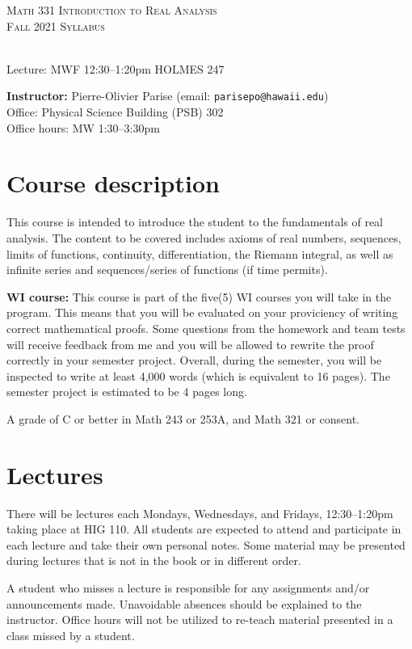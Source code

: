 \documentclass[12pt]{amsart}
\newcommand{\spacer}{\vspace{.2cm}}
\begin{document}
\noindent\hrulefill
\begin{center}
\large{\textsc{Math 331 Introduction to Real Analysis} } \\
\textsc{Fall 2021 Syllabus}
\end{center}
\hrulefill \\
Lecture: MWF 12:30--1:20pm \hfill HOLMES 247

\spacer

\noindent\textbf{Instructor:} Pierre-Olivier Parise (email: \texttt{parisepo@hawaii.edu})\\
Office: Physical Science Building (PSB) 302\\
Office hours: MW 1:30--3:30pm

\noindent\hrulefill

\section*{Course description}
This course is intended to introduce the student to the fundamentals of real analysis. The content to be covered includes axioms of real numbers, sequences, limits of functions, continuity, differentiation, the Riemann integral, as well as infinite series and sequences/series of functions (if time permits).

{\bf WI course:}
This course is part of the five(5) WI courses you will take in the program. This means that you will be evaluated on your proviciency of writing correct mathematical proofs. Some questions from the homework and team tests will receive feedback from me and you will be allowed to rewrite the proof correctly in your semester project. Overall, during the semester, you will be inspected to write at least 4,000 words (which is equivalent to 16 pages). The semester project is estimated to be 4 pages long.

A grade of C or better in Math 243 or 253A, and Math 321 or consent.

\section*{Lectures}
There will be lectures each Mondays, Wednesdays, and Fridays, 12:30--1:20pm taking place at HIG 110. All students are expected to attend and participate in each lecture and take their own personal notes. Some material may be presented during lectures that is not in the book or in different order.

A student who misses a lecture is responsible for any assignments and/or announcements made. Unavoidable absences should be explained to the instructor. Office hours will not be utilized to re-teach material presented in a class missed by a student. 
\end{document}
